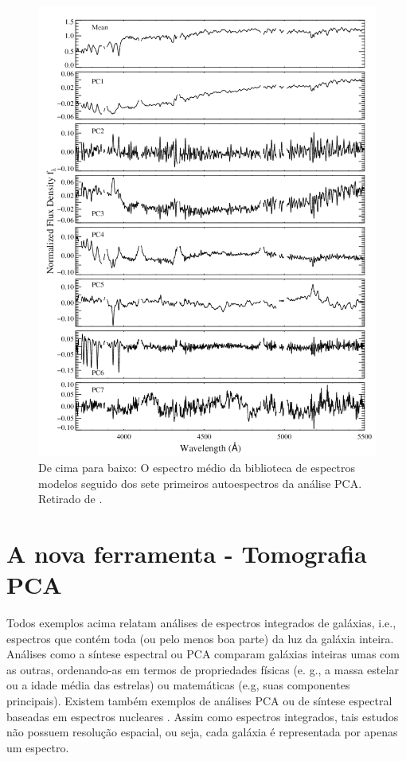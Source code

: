 \begin{figure}
    \includegraphics[height=1.\textwidth]{figuras/figChen2012fig2.pdf}
    \caption[Espectro médio e 7 primeiras PCs de uma biblioteca de modelos.]
    {De cima para baixo: O espectro médio da biblioteca de espectros modelos seguido dos sete primeiros autoespectros
    da análise PCA. Retirado de \citet{Chen2012}.}
    \label{fig:Chen2012fig2}
\end{figure}

\section{A nova ferramenta - Tomografia PCA}
\label{sec:Intro:TomoPCA}

Todos exemplos acima relatam análises de espectros integrados de galáxias, i.e., espectros que contém toda (ou pelo
menos boa parte) da luz da galáxia inteira. Análises como a síntese espectral ou PCA comparam galáxias inteiras umas com as
outras, ordenando-as em termos de propriedades físicas (e. g., a massa estelar ou a idade média das estrelas) ou
matemáticas (e.g, suas componentes principais). Existem também exemplos de análises PCA ou de síntese espectral baseadas
em espectros nucleares \citep[e.g., ][]{Trager2000I, CidFernandes2004}. Assim como espectros integrados, tais estudos
não possuem resolução espacial, ou seja, cada galáxia é representada por apenas um espectro.

